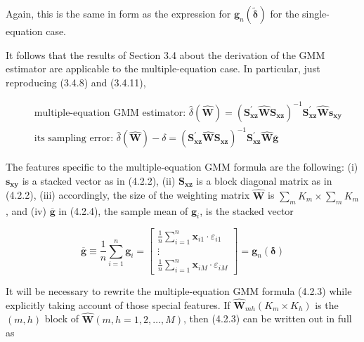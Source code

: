 \documentclass[10pt]{article}
\begin{document}
Again, this is the same in form as the expression for $\mathbf{g}_{n}(\tilde{\boldsymbol{\delta}})$ for the single-equation case.

It follows that the results of Section 3.4 about the derivation of the GMM estimator are applicable to the multiple-equation case. In particular, just reproducing (3.4.8) and (3.4.11),


\begin{align*}
& \text { multiple-equation GMM estimator: } \hat{\delta}(\widehat{\mathbf{W}})=\left(\mathbf{S}_{\mathbf{x z}}^{\prime} \widehat{\mathbf{W}} \mathbf{S}_{\mathbf{x z}}\right)^{-1} \mathbf{S}_{\mathbf{x z}}^{\prime} \widehat{\mathbf{W}} \mathbf{s}_{\mathbf{x y}}  \tag{4.2.3}\\
& \text { its sampling error: } \hat{\delta}(\widehat{\mathbf{W}})-\delta=\left(\mathbf{S}_{\mathbf{x z}}^{\prime} \widehat{\mathbf{W}} \mathbf{S}_{\mathbf{x z}}\right)^{-1} \mathbf{S}_{\mathbf{x z}}^{\prime} \widehat{\mathbf{W}} \overline{\mathbf{g}} \tag{4.2.4}
\end{align*}


The features specific to the multiple-equation GMM formula are the following: (i) $\mathbf{s}_{\mathbf{x y}}$ is a stacked vector as in (4.2.2), (ii) $\mathbf{S}_{\mathbf{x z}}$ is a block diagonal matrix as in (4.2.2), (iii) accordingly, the size of the weighting matrix $\widehat{\mathbf{W}}$ is $\sum_{m} K_{m} \times \sum_{m} K_{m}$, and (iv) $\overline{\mathbf{g}}$ in (4.2.4), the sample mean of $\mathbf{g}_{i}$, is the stacked vector

\[
\overline{\mathbf{g}} \equiv \frac{1}{n} \sum_{i=1}^{n} \mathbf{g}_{i}=\left[\begin{array}{c}
\frac{1}{n} \sum_{i=1}^{n} \mathbf{x}_{i 1} \cdot \varepsilon_{i 1}  \tag{4.2.5}\\
\vdots \\
\frac{1}{n} \sum_{i=1}^{n} \mathbf{x}_{i M} \cdot \varepsilon_{i M}
\end{array}\right]=\mathbf{g}_{n}(\boldsymbol{\delta})
\]

It will be necessary to rewrite the multiple-equation GMM formula (4.2.3) while explicitly taking account of those special features. If $\widehat{\mathbf{W}}_{m h}\left(K_{m} \times K_{h}\right)$ is the $(m, h)$ block of $\widehat{\mathbf{W}}(m, h=1,2, \ldots, M)$, then (4.2.3) can be written out in full as
\end{document}
